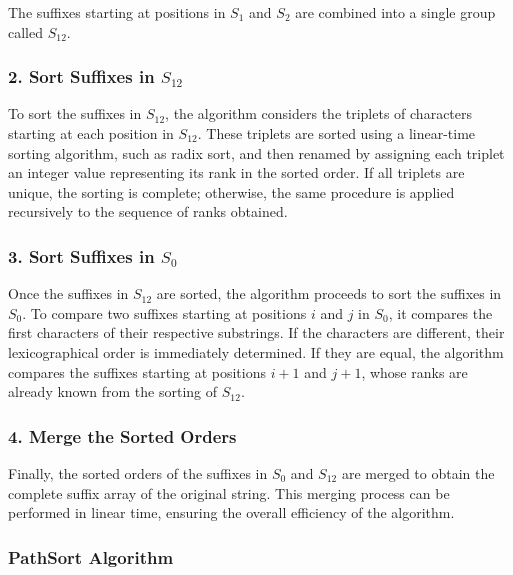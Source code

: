 The suffixes starting at positions in $S_1$ and $S_2$ are combined into a single group called $S_{12}$.

\subsubsection*{2. Sort Suffixes in $S_{12}$}

To sort the suffixes in $S_{12}$, the algorithm considers the triplets of characters starting at each position in $S_{12}$. These triplets are sorted using a linear-time sorting algorithm, such as radix sort, and then renamed by assigning each triplet an integer value representing its rank in the sorted order. If all triplets are unique, the sorting is complete; otherwise, the same procedure is applied recursively to the sequence of ranks obtained.

\subsubsection*{3. Sort Suffixes in $S_0$}

Once the suffixes in $S_{12}$ are sorted, the algorithm proceeds to sort the suffixes in $S_0$. To compare two suffixes starting at positions $i$ and $j$ in $S_0$, it compares the first characters of their respective substrings. If the characters are different, their lexicographical order is immediately determined. If they are equal, the algorithm compares the suffixes starting at positions $i+1$ and $j+1$, whose ranks are already known from the sorting of $S_{12}$.

\subsubsection*{4. Merge the Sorted Orders}

Finally, the sorted orders of the suffixes in $S_0$ and $S_{12}$ are merged to obtain the complete suffix array of the original string. This merging process can be performed in linear time, ensuring the overall efficiency of the algorithm.

\subsubsection{PathSort Algorithm} \label{sec:pathSort}

